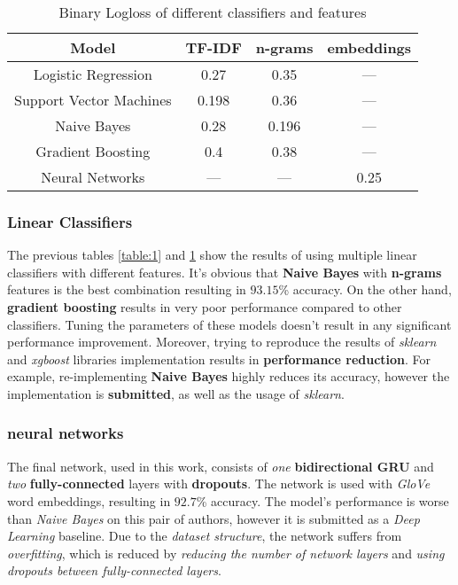 \documentclass[letterpaper, 10 pt, conference]{ieeeconf}  %
\begin{document}
\begin{table}[h!]
\centering
\begin{tabular}{||c | c | c | c||} 
 \hline
 Model & TF-IDF & n-grams & embeddings \\ [0.5ex] 
 \hline\hline
 Logistic Regression & 0.27 & 0.35 & --- \\ 
 \hline
 Support Vector Machines & 0.198 & 0.36 & --- \\
 \hline
 Naive Bayes & 0.28 & 0.196 & --- \\
 \hline
 Gradient Boosting & 0.4 & 0.38 & --- \\
 \hline
 Neural Networks & --- & --- & 0.25 \\ [1ex] 
 \hline
\end{tabular}
\caption{Binary Logloss of different classifiers and features}
\label{table:2}
\end{table}

\subsubsection{Linear Classifiers}
The previous tables \ref{table:1} and \ref{table:2} show the results of using multiple linear classifiers with different features. It's obvious that \textbf{Naive Bayes} with \textbf{n-grams} features is the best combination resulting in $93.15$\% accuracy. On the other hand, \textbf{gradient boosting} results in very poor performance compared to other classifiers. Tuning the parameters of these models doesn't result in any significant performance improvement. Moreover, trying to reproduce the results of \emph{sklearn} and \emph{xgboost} libraries implementation results in \textbf{performance reduction}. For example, re-implementing \textbf{Naive Bayes} highly reduces its accuracy, however the implementation is \textbf{submitted}, as well as the usage of \emph{sklearn}.

\subsubsection{neural networks}
The final network, used in this work, consists of \emph{one} \textbf{bidirectional GRU} and \emph{two} \textbf{fully-connected} layers with \textbf{dropouts}. The network is used with \emph{GloVe} word embeddings, resulting in $92.7$\% accuracy. The model's performance is worse than \emph{Naive Bayes} on this pair of authors, however it is submitted as a \emph{Deep Learning} baseline. Due to the \emph{dataset structure}, the network suffers from \emph{overfitting}, which is reduced by \emph{reducing the number of network layers} and \emph{using dropouts between fully-connected layers}.
\end{document}
